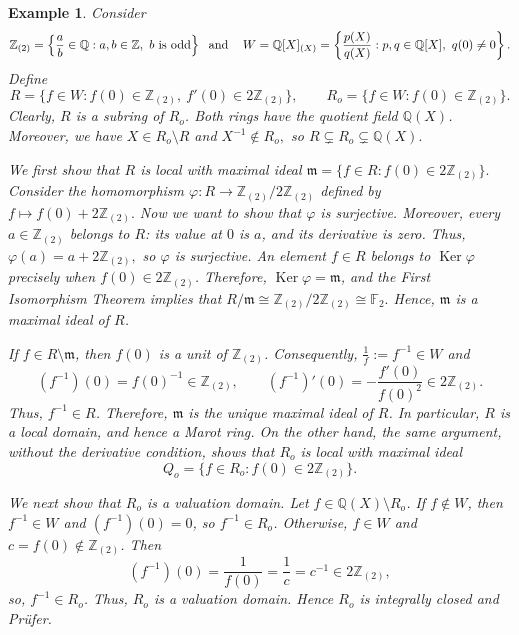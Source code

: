 \documentclass[12pt]{article}
\renewcommand{\ker}{\operatorname{Ker}}
\newtheorem{example}{Example}
\begin{document}
	\begin{example}\label{radical-conductor-converse}
		Consider
		\[\mathbb Z_{(2)}=\left\{\frac ab\in\mathbb Q:a,b\in\mathbb Z,\ b\text{ is odd}\right\}
		\hspace{1mm} \text{ and }\hspace{3mm} W=\mathbb Q[X]_{(X)}=\left\{\frac{p(X)}{q(X)}:p,q\in\mathbb Q[X],\ q(0)\neq0\right\}.\]
		Define
		\[ R=\{f\in W:f(0)\in \mathbb Z_{(2)},\ f'(0)\in2\mathbb Z_{(2)}\}, \qquad R_o=\{f\in W:f(0)\in \mathbb Z_{(2)}\}. \]
		Clearly, $R$ is a subring of $R_o$. Both rings have the quotient field $\mathbb Q(X)$. Moreover, we have $X\in R_o\setminus R$ and $X^{-1}\notin R_o,$ so $R\subsetneq R_o\subsetneq\mathbb Q(X).$
		
		We first show that $R$ is local with maximal ideal $\mathfrak m =\{f\in R:f(0)\in2\mathbb Z_{(2)}\}. $ Consider the homomorphism $\varphi:R\longrightarrow \mathbb Z_{(2)}/2\mathbb Z_{(2)}$ defined by $ f\longmapsto f(0)+2\mathbb Z_{(2)}.$ Now we want to show that $\varphi$ is surjective. Moreover, every $a\in\mathbb Z_{(2)}$ belongs to $R$: its value at $0$ is $a$, and its derivative is zero. Thus, $\varphi(a)=a+2\mathbb Z_{(2)}, $ so $\varphi$ is surjective. An element $f\in R$ belongs to $\ker\varphi$ precisely when $f(0)\in2\mathbb Z_{(2)}$. Therefore, $\ker\varphi=\mathfrak m$, and the First Isomorphism Theorem implies that $R/\mathfrak m \cong\mathbb Z_{(2)}/2\mathbb Z_{(2)} \cong\mathbb F_2.$ Hence, $\mathfrak m$ is a maximal ideal of $R$.
		
		If $f\in R\setminus\mathfrak m$, then $f(0)$ is a unit of $\mathbb Z_{(2)}$. Consequently, $\displaystyle\frac{1}{f}:=f^{-1}\in W$ and 
		\[(f^{-1})(0)=f(0)^{-1}\in \mathbb Z_{(2)},\qquad (f^{-1})'(0) =-\frac{f'(0)} {f(0)^2}\in2\mathbb Z_{(2)}. \]
		Thus, $f^{-1}\in R$. Therefore, $\mathfrak m$ is the unique maximal ideal of $R$. In particular, $R$ is a local domain, and hence a Marot ring. On the other hand, the same argument, without the derivative condition, shows that $R_o$ is local with maximal ideal \[ Q_o=\{f\in R_o:f(0)\in2\mathbb Z_{(2)}\}. \]
		
		We next show that $R_o$ is a valuation domain. Let $f\in\mathbb Q(X)\setminus R_o$. If $f\notin W$, then $f^{-1}\in W$ and $(f^{-1})(0)=0$, so
		$f^{-1}\in R_o$. Otherwise, $f\in W$ and $c=f(0)\notin \mathbb Z_{(2)}$.
		Then $$(f^{-1})(0) =\displaystyle\frac{1}{f(0)} =\displaystyle\frac{1}{c} =c^{-1}\in2\mathbb Z_{(2)},$$ so, $f^{-1}\in R_o$. Thus, $R_o$ is a valuation domain. Hence $R_o$ is integrally closed and Prüfer.
		

\end{example}
\end{document}
